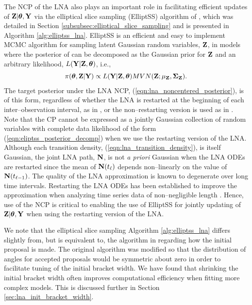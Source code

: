 The NCP of the LNA also plays an important role in facilitating efficient updates of $ \mathbf{Z}|\boldsymbol{\theta},\mathbf{Y} $ via the elliptical slice sampling (ElliptSS) algorithm of \cite{murray2010}, which was detailed in Section \ref{subsubsec:elliptical_slice_sampling} and is presented in Algorithm \ref{alg:elliptss_lna}. ElliptSS is an efficient and easy to implement MCMC algorithm for sampling latent Gaussian random variables, $ \mathbf{Z} $, in models where the posterior of can be decomposed as the Gaussian prior for $ \mathbf{Z} $ and an arbitrary likelihood, $ L(\mathbf{Y}|\mathbf{Z},\boldsymbol{\theta}) $, i.e.,
\begin{equation}
\label{eqn:eliptss_posterior_decomp}
\pi(\boldsymbol{\theta},\mathbf{Z}|\mathbf{Y})\propto L(\mathbf{Y}|\mathbf{Z},\boldsymbol{\theta})MVN(\mathbf{Z};\mu_{\mathbf{Z}},\boldsymbol{\Sigma}_{\mathbf{Z}}).
\end{equation}
The target posterior under the LNA NCP, (\ref{eqn:lna_noncentered_posterior}), is of this form, regardless of whether the LNA is restarted at the beginning of each inter--observation interval, as in \cite{fearnhead2014}, or the non--restarting version is used as in \cite{komorowski2009}. Note that the CP cannot be expressed as a jointly Gaussian collection of random variables with complete data likelihood of the form (\ref{eqn:eliptss_posterior_decomp}) when we use the restarting version of the LNA. Although each transition density, (\ref{eqn:lna_transition_density}), is itself Gaussian, the joint LNA path, $ \mathbf{N} $, is not \textit{a priori} Gaussian when the LNA ODEs are restarted since the mean of $ \mathbf{N}(t_\ell) $ depends non--linearly on the value of $ \mathbf{N}(t_{\ell-1}) $. The quality of the LNA approximation is known to degenerate over long time intervals. Restarting the LNA ODEs has been established to improve the approximation when analyzing time series data of non--negligible length \cite{fearnhead2014,giagos2010inference,folia2017trajectory,minas2017long}. Hence, use of the NCP is critical to enabling the use of ElliptSS for jointly updating of $ \mathbf{Z}|\boldsymbol{\theta},\mathbf{Y} $ when using the restarting version of the LNA. 

We note that the elliptical slice sampling Algorithm \ref{alg:elliptss_lna} differs slightly from, but is equivalent to, the algorithm in \cite{murray2010} regarding how the initial proposal is made. The original algorithm was modified so that the distribution of angles for accepted proposals would be symmetric about zero in order to facilitate tuning of the initial bracket width. We have found that shrinking the initial bracket width often improves computational efficiency when fitting more complex models. This is discussed further in Section \ref{sec:lna_init_bracket_width}.

